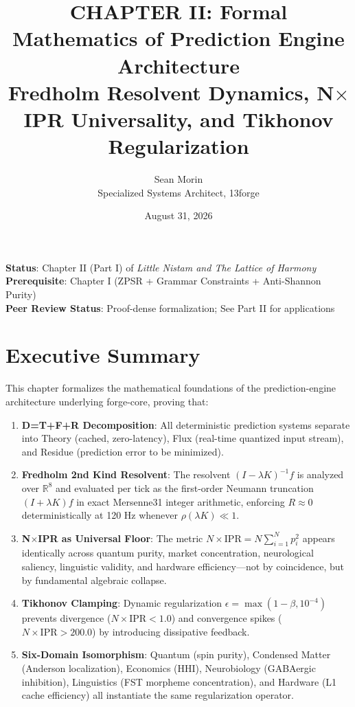 \documentclass[11pt,oneside]{article}
\title{CHAPTER II: Formal Mathematics of Prediction Engine Architecture\\
Fredholm Resolvent Dynamics, N\ensuremath{\times}IPR Universality, and Tikhonov Regularization}
\author{Sean Morin \\ Specialized Systems Architect, 13forge}
\date{August 31, 2026}
\theoremstyle{definition}
\begin{document}
\maketitle

\begin{center}
\textbf{Status}: Chapter II (Part I) of \emph{Little Nistam and The Lattice of Harmony} \\
\textbf{Prerequisite}: Chapter I (ZPSR + Grammar Constraints + Anti-Shannon Purity) \\
\textbf{Peer Review Status}: Proof-dense formalization; See Part II for applications
\end{center}

\section*{Executive Summary}

This chapter formalizes the mathematical foundations of the prediction-engine architecture underlying forge-core, proving that:

\begin{enumerate}
  \item \textbf{D=T+F+R Decomposition}: All deterministic prediction systems separate into Theory (cached, zero-latency), Flux (real-time quantized input stream), and Residue (prediction error to be minimized).

  \item \textbf{Fredholm 2nd Kind Resolvent}: The resolvent $(I - \lambda K)^{-1} f$ is analyzed over $\mathbb{R}^8$ and evaluated per tick as the first-order Neumann truncation $(I + \lambda K)f$ in exact Mersenne31 integer arithmetic, enforcing $R \approx 0$ deterministically at 120 Hz whenever $\rho(\lambda K) \ll 1$.

  \item \textbf{N\ensuremath{\times}IPR as Universal Floor}: The metric $N \times \text{IPR} = N \sum_{i=1}^N p_i^2$ appears identically across quantum purity, market concentration, neurological saliency, linguistic validity, and hardware efficiency—not by coincidence, but by fundamental algebraic collapse.

  \item \textbf{Tikhonov Clamping}: Dynamic regularization $\epsilon = \max(1-\beta, 10^{-4})$ prevents divergence ($N \times \text{IPR} < 1.0$) and convergence spikes ($N \times \text{IPR} > 200.0$) by introducing dissipative feedback.

  \item \textbf{Six-Domain Isomorphism}: Quantum (spin purity), Condensed Matter (Anderson localization), Economics (HHI), Neurobiology (GABAergic inhibition), Linguistics (FST morpheme concentration), and Hardware (L1 cache efficiency) all instantiate the same regularization operator.
\end{enumerate}
\end{document}

